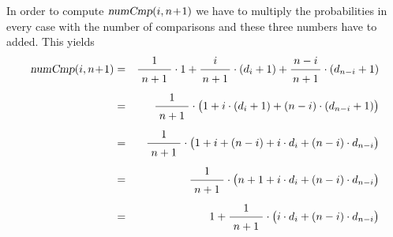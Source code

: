 In order to compute  $\textsl{numCmp}(i, n\!+\!1)$ we have to multiply the probabilities in every
case with the number of comparisons and these three numbers have to added.  This yields
\begin{eqnarray*}
  \textsl{numCmp}(i, n\!+\!1) 
& = & \bruch{1}{\,n+1\,} \cdot 1 + \bruch{i}{n+1} \cdot (d_i + 1) + \bruch{n-i}{n+1} \cdot (d_{n-i} + 1) 
      \\[0.2cm]
& = & \bruch{1}{\,n+1\,} \cdot \bigl(1 + i \cdot (d_i + 1) + (n-i) \cdot (d_{n-i} + 1)\bigr)      \\[0.2cm]
& = & \bruch{1}{\,n+1\,} \cdot \bigl(1 + i + (n-i) + i \cdot d_i + (n-i) \cdot d_{n-i} \bigr)    \\[0.2cm]
& = & \bruch{1}{\,n+1\,} \cdot \bigl(n + 1 + i \cdot d_i + (n-i) \cdot d_{n-i} \bigr)            \\[0.2cm]
& = & 1 + \bruch{1}{\,n+1\,} \cdot \bigl(i \cdot d_i + (n-i) \cdot d_{n-i} \bigr) 
\end{eqnarray*}


